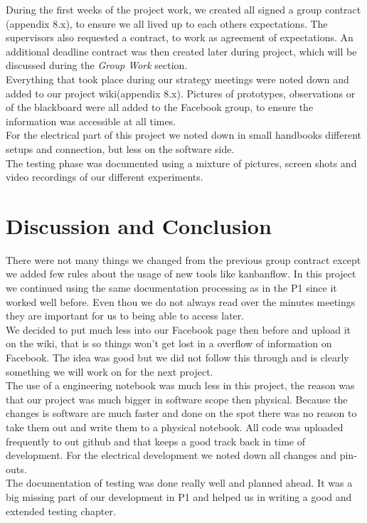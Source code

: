 During the first weeks of the project work, we created all signed a group contract (appendix 8.x), to ensure we all lived up to each others expectations. The supervisors also requested a contract, to work as agreement of expectations. An additional deadline contract was then created later during project, which will be discussed during the \textit{Group Work} section.\\
Everything that took place during our strategy meetings were noted down and added to our project wiki(appendix 8.x). Pictures of prototypes, observations or of the blackboard were all added to the Facebook group, to ensure the information was accessible at all times.\\
For the electrical part of this project we noted down in small handbooks different setups and connection, but less on the software side.\\
The testing phase was documented using a mixture of  pictures, screen shots and video recordings of our different experiments.

\section{Discussion and Conclusion}

There were not many things we changed from the previous group contract except we added few rules about the usage of new tools like kanbanflow. In this project we continued using the same documentation processing as in the P1 since it worked well before. Even thou we do not always read over the minutes meetings they are important for us to being able to access later.\\
We decided to put much less into our Facebook page then before and upload it on the wiki, that is so things won't get lost in a overflow of information on Facebook. The idea was good but we did not follow this through and is clearly something we will work on for the next project.\\
The use of a engineering notebook was much less in this project, the reason was that our project was much bigger in software scope then physical. Because the changes is software are much faster and done on the spot there was no reason to take them out and write them to a physical notebook. All code was uploaded frequently to out github and that keeps a good track back in time of development. For the electrical development we noted down all changes and pin-outs.\\
The documentation of testing was done really well and planned ahead. It was a big missing part of our development in P1 and helped us in writing a good and extended testing chapter.
